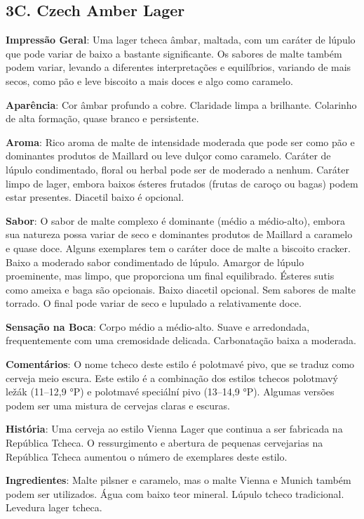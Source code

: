 \subsection*{3C. Czech Amber Lager}

\textbf{Impressão Geral}: Uma lager tcheca âmbar, maltada, com um caráter de lúpulo que pode variar de baixo a bastante significante. Os sabores de malte também podem variar, levando a diferentes interpretações e equilíbrios, variando de mais secos, como pão e leve biscoito a mais doces e algo como caramelo.

\textbf{Aparência}: Cor âmbar profundo a cobre. Claridade limpa a brilhante. Colarinho de alta formação, quase branco e persistente.

\textbf{Aroma}: Rico aroma de malte de intensidade moderada que pode ser como pão e dominantes produtos de Maillard ou leve dulçor como caramelo. Caráter de lúpulo condimentado, floral ou herbal pode ser de moderado a nenhum. Caráter limpo de lager, embora baixos ésteres frutados (frutas de caroço ou bagas) podem estar presentes. Diacetil baixo é opcional.

\textbf{Sabor}: O sabor de malte complexo é dominante (médio a médio-alto), embora sua natureza possa variar de seco e dominantes produtos de Maillard a caramelo e quase doce. Alguns exemplares tem o caráter doce de malte a biscoito cracker. Baixo a moderado sabor condimentado de lúpulo. Amargor de lúpulo proeminente, mas limpo, que proporciona um final equilibrado. Ésteres sutis como ameixa e baga são opcionais. Baixo diacetil opcional. Sem sabores de malte torrado. O final pode variar de seco e lupulado a relativamente doce.

\textbf{Sensação na Boca}: Corpo médio a médio-alto. Suave e arredondada, frequentemente com uma cremosidade delicada. Carbonatação baixa a moderada.

\textbf{Comentários}: O nome tcheco deste estilo é polotmavé pivo, que se traduz como cerveja meio escura. Este estilo é a combinação dos estilos tchecos polotmavý ležák (11–12,9 °P) e polotmavé speciální pivo (13–14,9 °P). Algumas versões podem ser uma mistura de cervejas claras e escuras.

\textbf{História}: Uma cerveja ao estilo Vienna Lager que continua a ser fabricada na República Tcheca. O ressurgimento e abertura de pequenas cervejarias na República Tcheca aumentou o número de exemplares deste estilo.

\textbf{Ingredientes}: Malte pilsner e caramelo, mas o malte Vienna e Munich também podem ser utilizados. Água com baixo teor mineral. Lúpulo tcheco tradicional. Levedura lager tcheca.

